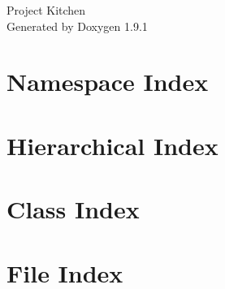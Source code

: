 \let\mypdfximage\pdfximage\def\pdfximage{\immediate\mypdfximage}\documentclass[twoside]{book}
\newcommand{\+}{\discretionary{\mbox{\scriptsize$\hookleftarrow$}}{}{}}
\newcommand{\clearemptydoublepage}{%
  \newpage{\pagestyle{empty}\cleardoublepage}%
}
\begin{document}
\raggedbottom

\hypersetup{pageanchor=false,
             bookmarksnumbered=true,
             pdfencoding=unicode
            }
\begin{titlepage}
\vspace*{7cm}
\begin{center}%
{\Large Project Kitchen }\\
\vspace*{1cm}
{\large Generated by Doxygen 1.9.1}\\
\end{center}
\end{titlepage}
\clearemptydoublepage
{}
\tableofcontents
\clearemptydoublepage
{}
\hypersetup{pageanchor=true}

\chapter{Namespace Index}

\chapter{Hierarchical Index}

\chapter{Class Index}

\chapter{File Index}

\end{document}
